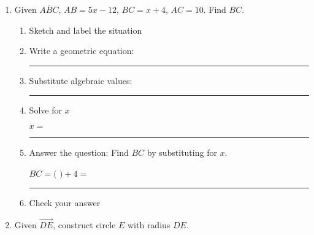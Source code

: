 \documentclass[12pt, oneside]{article}
\begin{document}
\begin{enumerate}
\newpage
    \item Given $\overline{ABC}$, $AB=5x-12$, $BC=x+4$, $AC=10$. Find ${BC}$.
    \begin{enumerate}
      \item Sketch and label the situation
      \begin{flushright}
      \end{flushright} \vspace{1cm}
      \item Write a geometric equation: \rule{5cm}{0.15mm} \vspace{1cm}
      \item Substitute algebraic values: \rule{5cm}{0.15mm}
      \item Solve for $x$
      \vspace{3cm}
      \begin{center} $x=$ \rule{1cm}{0.15mm} \end{center}
      \item Answer the question: Find $BC$ by substituting for $x$.\\
      \begin{center} $BC=($ \hspace{1cm} $)+4=$ \rule{1cm}{0.15mm} \end{center}
      \item Check your answer
    \end{enumerate}
    \vspace{2cm}

    \item Given $\overrightarrow{DE}$, construct circle $E$ with radius $DE$.
    \vspace{3cm}
    \begin{center}
    \end{center}

  \end{enumerate}
\end{document}
